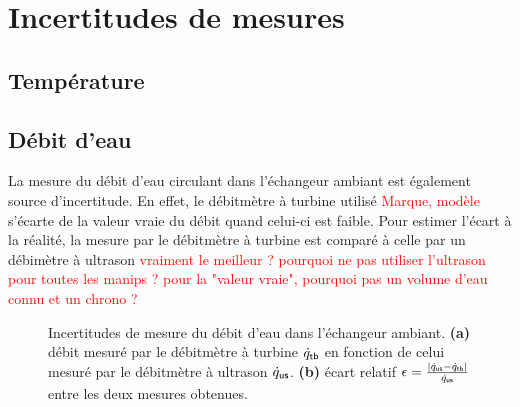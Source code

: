 \section{Incertitudes de mesures}


\subsection{Température}



\subsection{Débit d'eau}

La mesure du débit d'eau circulant dans l'échangeur ambiant est également source d'incertitude. En effet, le débitmètre à turbine utilisé \textcolor{red}{Marque, modèle} s'écarte de la valeur vraie du débit quand celui-ci est faible. Pour estimer l'écart à la réalité, la mesure par le débitmètre à turbine est comparé à celle par un débimètre à ultrason \textcolor{red}{vraiment le meilleur ? pourquoi ne pas utiliser l'ultrason pour toutes les manips ? pour la "valeur vraie", pourquoi pas un volume d'eau connu et un chrono ?}

\begin{figure}[!ht]
    \centering
    
    \caption[Incertitudes de mesure du débit d'eau dans l'échangeur ambiant]{Incertitudes de mesure du débit d'eau dans l'échangeur ambiant. \textbf{(a)} débit mesuré par le débitmètre à turbine $\dot q_{\sf tb}$ en fonction de celui mesuré par le débitmètre à ultrason $\dot q_{\sf us}$. \linebreak\textbf{(b)} écart relatif $\epsilon=\frac{|\dot q_{\sf us}-\dot q_{\sf tb}|}{\dot q_{\sf us}}$ entre les deux mesures obtenues.}
    \label{fig:IncertitudeDebitEau}
\end{figure}